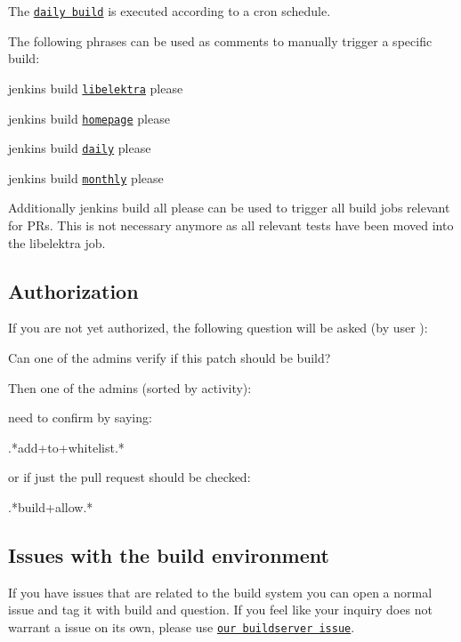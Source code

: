 The \href{https://build.libelektra.org/jenkins/job/libelektra-daily/}{\tt daily build} is executed according to a cron schedule.

The following phrases can be used as comments to manually trigger a specific build\+:


\begin{DoxyItemize}
\item jenkins build \href{https://build.libelektra.org/jenkins/job/libelektra/}{\tt libelektra} please
\item jenkins build \href{https://build.libelektra.org/job/elektra-homepage/}{\tt homepage} please
\item jenkins build \href{https://build.libelektra.org/jenkins/job/libelektra-daily/}{\tt daily} please
\item jenkins build \href{https://build.libelektra.org/jenkins/job/libelektra-monthly/}{\tt monthly} please
\end{DoxyItemize}

Additionally {\ttfamily jenkins build all please} can be used to trigger all build jobs relevant for PR\textquotesingle{}s. This is not necessary anymore as all relevant tests have been moved into the libelektra job.

\subsection*{Authorization}

If you are not yet authorized, the following question will be asked (by user )\+: \begin{DoxyVerb}Can one of the admins verify if this patch should be build?
\end{DoxyVerb}


Then one of the admins (sorted by activity)\+:


\begin{DoxyItemize}
\item 
\item 
\item 
\item 
\item 
\item 
\end{DoxyItemize}

need to confirm by saying\+: \begin{DoxyVerb}.*add\W+to\W+whitelist.*
\end{DoxyVerb}


or if just the pull request should be checked\+: \begin{DoxyVerb}.*build\W+allow.*
\end{DoxyVerb}


\subsection*{Issues with the build environment}

If you have issues that are related to the build system you can open a normal issue and tag it with {\ttfamily build} and {\ttfamily question}. If you feel like your inquiry does not warrant a issue on its own, please use \href{https://issues.libelektra.org/160}{\tt our buildserver issue}. 